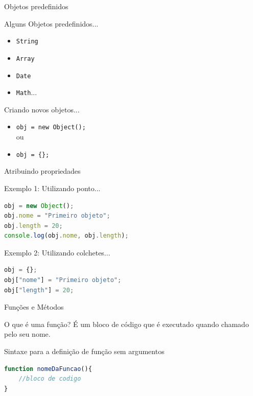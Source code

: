 \documentclass[xcolor=dvipsnames,table]{beamer}
\begin{document}
\begin{frame}{Objetos predefinidos}
	\begin{block}{Alguns Objetos predefinidos...}
		\begin{itemize}
			\item {\tt String}
			\item {\tt Array}
			\item {\tt Date}
			\item {\tt Math}...
		\end{itemize}
	\end{block} 
	\begin{block}{Criando novos objetos...}
		\begin{itemize}
			\item {\tt obj = new Object();}
			\\ou
			\item {\tt obj = \{\};}
		\end{itemize}
	\end{block}
\end{frame}

\begin{frame}[fragile]{Atribuindo propriedades}
	\begin{block}{Exemplo 1: Utilizando ponto...}
		\begin{lstlisting}[language=JavaScript]
obj = new Object();
obj.nome = "Primeiro objeto";
obj.length = 20;
console.log(obj.nome, obj.length);
\end{lstlisting}	
	\end{block} 
	\begin{block}{Exemplo 2: Utilizando colchetes...}
		\begin{lstlisting}[language=JavaScript]
obj = {};
obj["nome"] = "Primeiro objeto";
obj["length"] = 20;
\end{lstlisting}	
	\end{block}
\end{frame}

\begin{frame}[fragile]{Funções e Métodos}
	\begin{block}{O que é uma função?}
		É um bloco de código que é executado quando chamado pelo seu nome.
	\end{block} 
	\begin{block}{Sintaxe para a definição de função sem argumentos}
		\begin{lstlisting}[language=JavaScript]
function nomeDaFuncao(){
	//bloco de codigo
}
\end{lstlisting}	
	\end{block}
\end{frame}
\end{document}
